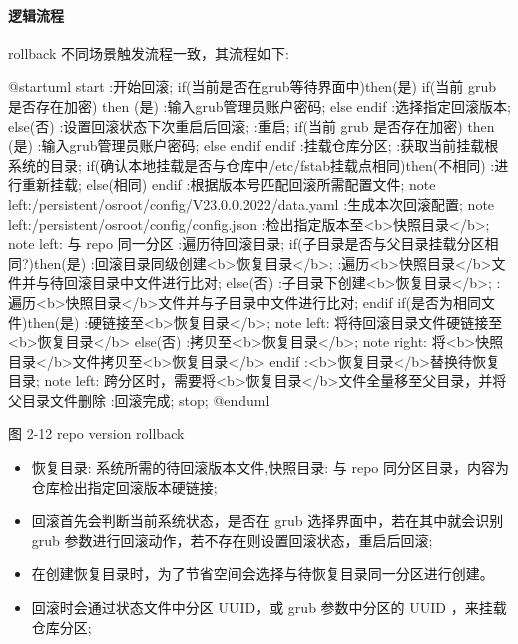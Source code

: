 \documentclass{utart}
\begin{document}
\paragraph{逻辑流程}
rollback 不同场景触发流程一致，其流程如下:
\begin{center}
  \begin{adjustbox}{scale=0.75}
    \begin{plantuml}
      @startuml
      start
      :开始回滚;
      if(当前是否在grub等待界面中)then(是)
      if(当前 grub 是否存在加密) then (是)
      :输入grub管理员账户密码;
      else
      endif
      :选择指定回滚版本;
      else(否)
      :设置回滚状态下次重启后回滚;
      :重启;
      if(当前 grub 是否存在加密) then (是)
      :输入grub管理员账户密码;
      else
      endif
      endif
      :挂载仓库分区;
      :获取当前挂载根系统的目录;
      if(确认本地挂载是否与仓库中/etc/fstab挂载点相同)then(不相同)
      :进行重新挂载;
      else(相同)
      endif
      :根据版本号匹配回滚所需配置文件;
      note left:/persistent/osroot/config/V23.0.0.2022/data.yaml
      :生成本次回滚配置;
      note left:/persistent/osroot/config/config.json
      :检出指定版本至<b>快照目录</b>;
      note left: 与 repo 同一分区
      :遍历待回滚目录;
      if(子目录是否与父目录挂载分区相同?)then(是)
      :回滚目录同级创建<b>恢复目录</b>;
      :遍历<b>快照目录</b>文件并与待回滚目录中文件进行比对;
      else(否)
      :子目录下创建<b>恢复目录</b>;
      :遍历<b>快照目录</b>文件并与子目录中文件进行比对;
      endif
      if(是否为相同文件)then(是)
      :硬链接至<b>恢复目录</b>;
      note left: 将待回滚目录文件硬链接至<b>恢复目录</b>
      else(否)
      :拷贝至<b>恢复目录</b>;
      note right: 将<b>快照目录</b>文件拷贝至<b>恢复目录</b>
      endif
      :<b>恢复目录</b>替换待恢复目录;
      note left: 跨分区时，需要将<b>恢复目录</b>文件全量移至父目录，并将父目录文件删除
      :回滚完成;
      stop;
      @enduml
    \end{plantuml}
  \end{adjustbox}

  图 2-12 repo version rollback
\end{center}

\begin{itemize}[leftmargin=4em]
  \item 恢复目录: 系统所需的待回滚版本文件,快照目录:  与 repo 同分区目录，内容为仓库检出指定回滚版本硬链接;
  \item 回滚首先会判断当前系统状态，是否在 grub 选择界面中，若在其中就会识别 grub 参数进行回滚动作，若不存在则设置回滚状态，重启后回滚;
  \item 在创建恢复目录时，为了节省空间会选择与待恢复目录同一分区进行创建。
  \item 回滚时会通过状态文件中分区 UUID，或 grub 参数中分区的 UUID ，来挂载仓库分区;
\end{itemize}
\end{document}
